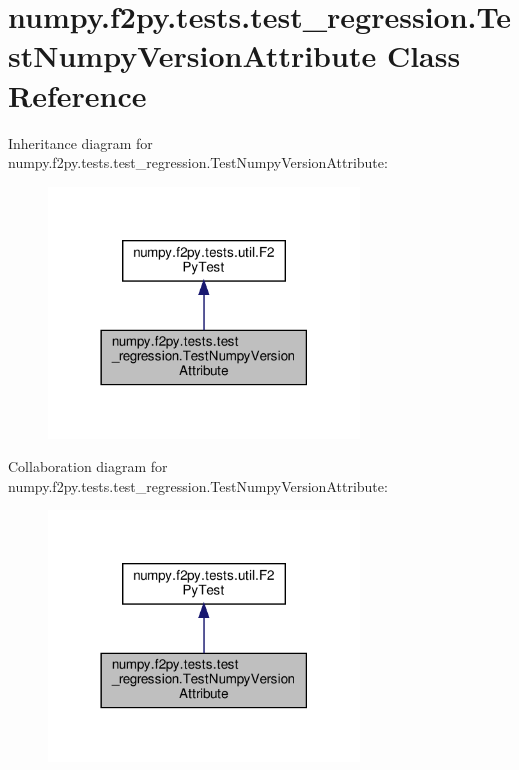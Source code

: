 \hypertarget{classnumpy_1_1f2py_1_1tests_1_1test__regression_1_1TestNumpyVersionAttribute}{}\section{numpy.\+f2py.\+tests.\+test\+\_\+regression.\+Test\+Numpy\+Version\+Attribute Class Reference}
\label{classnumpy_1_1f2py_1_1tests_1_1test__regression_1_1TestNumpyVersionAttribute}


Inheritance diagram for numpy.\+f2py.\+tests.\+test\+\_\+regression.\+Test\+Numpy\+Version\+Attribute\+:
\nopagebreak
\begin{figure}[H]
\begin{center}
\leavevmode
\includegraphics[width=234pt]{classnumpy_1_1f2py_1_1tests_1_1test__regression_1_1TestNumpyVersionAttribute__inherit__graph}
\end{center}
\end{figure}


Collaboration diagram for numpy.\+f2py.\+tests.\+test\+\_\+regression.\+Test\+Numpy\+Version\+Attribute\+:
\nopagebreak
\begin{figure}[H]
\begin{center}
\leavevmode
\includegraphics[width=234pt]{classnumpy_1_1f2py_1_1tests_1_1test__regression_1_1TestNumpyVersionAttribute__coll__graph}
\end{center}
\end{figure}
